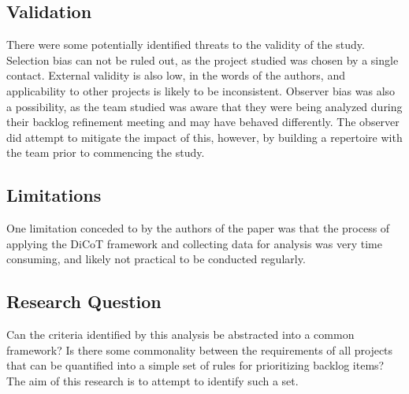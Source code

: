 \subsection{Validation}
There were some potentially identified threats to the validity of the study. Selection bias can not be ruled out, as the project studied was chosen by a single contact. External validity is also low, in the words of the authors, and applicability to other projects is likely to be inconsistent. Observer bias was also a possibility, as the team studied was aware that they were being analyzed during their backlog refinement meeting and may have behaved differently. The observer did attempt to mitigate the impact of this, however, by building a repertoire with the team prior to commencing the study.

\subsection{Limitations}
One limitation conceded to by the authors of the paper was that the process of applying the DiCoT framework and collecting data for analysis was very time consuming, and likely not practical to be conducted regularly.

\subsection{Research Question}
Can the criteria identified by this analysis be abstracted into a common framework? Is there some commonality between the requirements of all projects that can be quantified into a simple set of rules for prioritizing backlog items? The aim of this research is to attempt to identify such a set.

